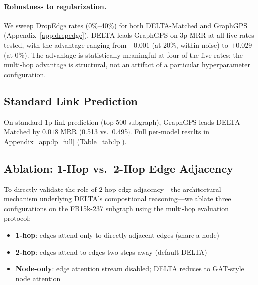 \documentclass{article}
\begin{document}
\paragraph{Robustness to regularization.}
We sweep DropEdge rates (0\%--40\%) for both DELTA-Matched and GraphGPS (Appendix~\ref{app:dropedge}). DELTA leads GraphGPS on 3p MRR at all five rates tested, with the advantage ranging from $+0.001$ (at 20\%, within noise) to $+0.029$ (at 0\%). The advantage is statistically meaningful at four of the five rates; the multi-hop advantage is structural, not an artifact of a particular hyperparameter configuration.

\subsection{Standard Link Prediction}
\label{sec:exp_lp}

On standard 1p link prediction (top-500 subgraph), GraphGPS leads DELTA-Matched by $0.018$ MRR (0.513 vs.\ 0.495). Full per-model results in Appendix~\ref{app:lp_full} (Table~\ref{tab:lp}).

\subsection{Ablation: 1-Hop vs.\ 2-Hop Edge Adjacency}
\label{sec:exp_ablation}

To directly validate the role of 2-hop edge adjacency---the architectural mechanism underlying DELTA's compositional reasoning---we ablate three configurations on the FB15k-237 subgraph using the multi-hop evaluation protocol:

\begin{itemize}
    \item \textbf{1-hop}: edges attend only to directly adjacent edges (share a node)
    \item \textbf{2-hop}: edges attend to edges two steps away (default DELTA)
    \item \textbf{Node-only}: edge attention stream disabled; DELTA reduces to GAT-style node attention
\end{itemize}
\end{document}
